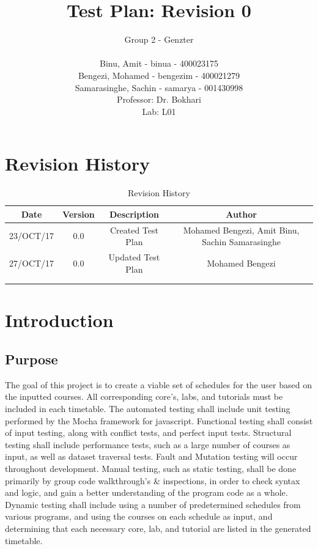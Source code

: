 \documentclass[11pt, oneside]{article}   	%
\title{Test Plan: Revision 0}
\author{Group 2 - Genzter \\
		\\ Binu, Amit - binua - 400023175
		\\ Bengezi, Mohamed - bengezim - 400021279
		\\ Samarasinghe, Sachin - samarya - 001430998
		\\Professor: Dr. Bokhari
		\\ Lab: L01}
\begin{document}
\maketitle

\newpage
\section{Revision History}

\begin{table}[h]
\begin{center}
\begin{tabular}{ | c | c | c | c | }
\hline
 Date & Version & Description & Author \\ 
\hline
 23/OCT/17 & 0.0 & Created Test Plan & Mohamed Bengezi, Amit Binu, Sachin Samarasinghe \\  
\hline
 27/OCT/17 & 0.0 & Updated Test Plan & Mohamed Bengezi \\  
\hline
 & & & \\
\hline 
 & & & \\ 
\hline 
\end{tabular}
\end{center}
\caption{Revision History}
\end{table}

\newpage
\tableofcontents
\listoffigures
\listoftables

\newpage
\section{Introduction}
\subsection{Purpose}
The goal of this project is to create a viable set of schedules for the user based on the inputted courses. All corresponding core's, labs, and tutorials must be included in each timetable. The automated testing shall include unit testing performed by the Mocha framework for javascript. Functional testing shall consist of input testing, along with conflict tests, and perfect input tests. Structural testing shall include performance tests, such as a large number of courses as input, as well as dataset traversal tests. Fault and Mutation testing will occur throughout development. Manual testing, such as static testing, shall be done primarily by group code walkthrough's \& inspections, in order to check syntax and logic, and gain a better understanding of the program code as a whole. Dynamic testing shall include using a number of predetermined schedules from various programs, and using the courses on each schedule as input, and determining that each necessary core, lab, and tutorial are listed in the generated timetable. 
\end{document}
